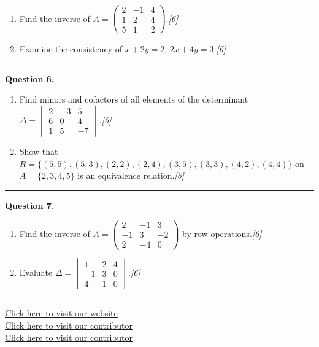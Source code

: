 \documentclass[11pt,a4paper]{article}
\newcommand{\pts}[1]{\hfill   \textit{[#1]}}
\begin{document}
\begin{enumerate}[label=(\alph*),leftmargin=*,itemsep=5pt]
  \item Find the inverse of $A=
\begin{pmatrix}2&-1&4\\1&2&4\\5&1&2\end{pmatrix}$.\pts{6}
  \item Examine the consistency of $x+2y=2$, $2x+4y=3$.\pts{6}
\end{enumerate}
\medskip\rule{\linewidth}{0.2pt}

\medskip


\noindent   \textbf{Question 6.}

\begin{enumerate}[label=(\alph*),leftmargin=*,itemsep=5pt]
  \item Find minors and cofactors of all elements of the determinant
  $\Delta=
\begin{vmatrix}2&-3&5\\6&0&4\\1&5&-7\end{vmatrix}$.\pts{6}
  \item Show that $R=\{(5,5),(5,3),(2,2),(2,4),(3,5),(3,3),(4,2),(4,4)\}$ on $A=\{2,3,4,5\}$ is an equivalence relation.\pts{6}
\end{enumerate}
\medskip\rule{\linewidth}{0.2pt}

\medskip


\noindent   \textbf{Question 7.}

\begin{enumerate}[label=(\alph*),leftmargin=*,itemsep=5pt]
  \item Find the inverse of $A=
\begin{pmatrix}2&-1&3\\-1&3&-2\\2&-4&0\end{pmatrix}$ by row operations.\pts{6}
  \item Evaluate $\Delta=
\begin{vmatrix}1&2&4\\-1&3&0\\4&1&0\end{vmatrix}$.\pts{6}
\end{enumerate}

\vfill\rule{\linewidth}{0.4pt}

\begin{center}\small
\href{https://bhu-exam.vercel.app/}{Click here to visit our website}\\[4pt]
\href{https://me-aryan.vercel.app/}{Click here to visit our contributor}\\[4pt]
\href{https://quashan-me.vercel.app/}{Click here to visit our contributor}
\end{center}
\end{document}
